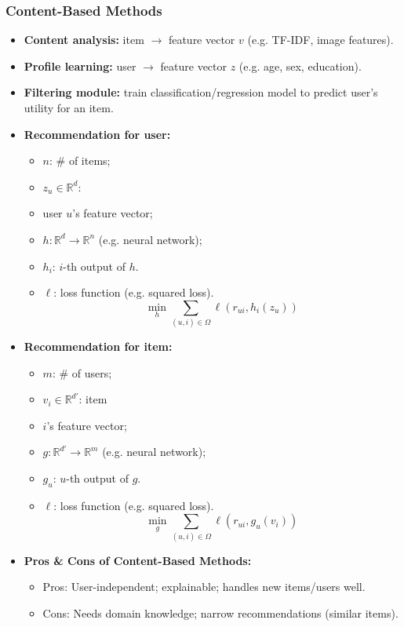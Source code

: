 \documentclass[UTF8]{ctexart}
\begin{document}
\subsubsection{Content-Based Methods}
    \begin{itemize}
        \item \textbf{Content analysis:} item $\to$ feature vector $v$ (e.g. TF-IDF, image features).
        \item \textbf{Profile learning:} user $\to$ feature vector $z$ (e.g. age, sex, education).
        \item \textbf{Filtering module:} train classification/regression model to predict user's utility for an item.
        \item \textbf{Recommendation for user:}
        \begin{itemize}
            \item $n$: \# of items; 
            \item $z_u \in \mathbb{R}^d$: 
            \item user $u$'s feature vector; 
            \item $h: \mathbb{R}^d \to \mathbb{R}^n$ (e.g. neural network);
            \item $h_i$: $i$-th output of $h$.
            \item $\ell$: loss function (e.g. squared loss).
            \[\min_h \sum_{(u,i) \in \Omega} \ell(r_{ui}, h_i(z_u))\]
        \end{itemize}

        \item \textbf{Recommendation for item:}
        \begin{itemize}
            \item $m$: \# of users; 
            \item $v_i \in \mathbb{R}^{d'}$: item 
            \item $i$'s feature vector; 
            \item $g: \mathbb{R}^{d'} \to \mathbb{R}^m$ (e.g. neural network); 
            \item $g_u$: $u$-th output of $g$.
            \item $\ell$: loss function (e.g. squared loss).
            \[\min_g \sum_{(u,i) \in \Omega} \ell(r_{ui}, g_u(v_i))\]
        \end{itemize}
        \item \textbf{Pros \& Cons of Content-Based Methods:}
        \begin{itemize}
            \item Pros: User-independent; explainable; handles new items/users well.
            \item Cons: Needs domain knowledge; narrow recommendations (similar items).
        \end{itemize}
    \end{itemize}
\end{document}
